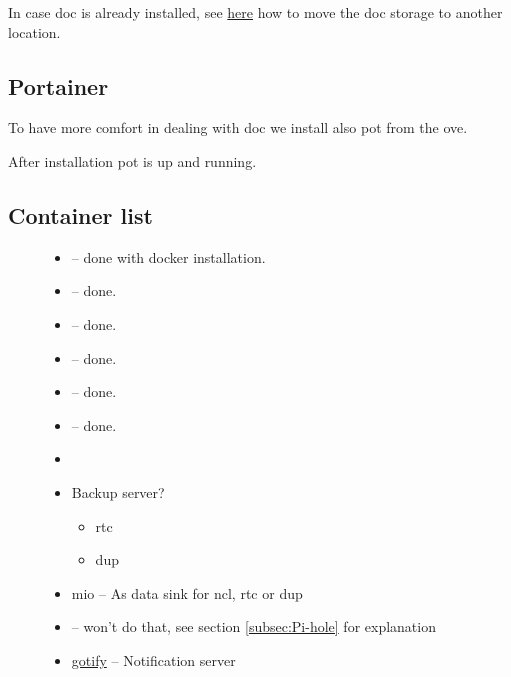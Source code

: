 In case \gls{doc} is already installed, see \href{https://www.reddit.com/r/OpenMediaVault/comments/fl40gf/moving_docker_storage/}{here}
how to move the \gls{doc} storage to another location.

\subsection{Portainer}

To have more comfort in dealing with \gls{doc} we install also \gls{pot}
from the \gls{ove}.


After installation \gls{pot} is up and running.


\subsection{Container list}

\begin{figure}[H]
    \begin{itemize}
        \item {}
              -- done with docker installation.
        \item {}
              -- done.
        \item {}
              -- done.
        \item {}
              -- done.
        \item {}
              -- done.
        \item {}
              -- done.
        \item {}
        \item Backup server?
              \begin{itemize}
                  \item \gls{rtc}
                  \item \gls{dup}
              \end{itemize}
        \item \gls{mio} -- As data sink for \gls{ncl},
              \gls{rtc} or \gls{dup}
        \item {}
              -- won't do that, see section \ref{subsec:Pi-hole} for explanation
        \item \href{https://gotify.net/}{gotify} -- Notification server
    \end{itemize}
\end{figure}

